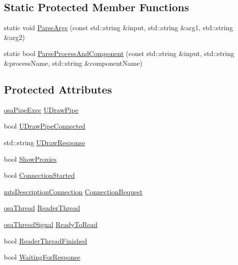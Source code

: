 \subsection*{Static Protected Member Functions}
\begin{DoxyCompactItemize}
\item 
static void \hyperlink{classmts_component_viewer_a514501a010d6f9cde03032d7853cde39}{Parse\-Args} (const std\-::string \&input, std\-::string \&arg1, std\-::string \&arg2)
\item 
static bool \hyperlink{classmts_component_viewer_aaaa3f74701e2fc95e7a26939dccee4b1}{Parse\-Process\-And\-Component} (const std\-::string \&input, std\-::string \&process\-Name, std\-::string \&component\-Name)
\end{DoxyCompactItemize}
\subsection*{Protected Attributes}
\begin{DoxyCompactItemize}
\item 
\hyperlink{classosa_pipe_exec}{osa\-Pipe\-Exec} \hyperlink{classmts_component_viewer_a4f2747dc20890be285fa6b031516c6dc}{U\-Draw\-Pipe}
\item 
bool \hyperlink{classmts_component_viewer_a7590f5f827427231d8fe2bd813feb22e}{U\-Draw\-Pipe\-Connected}
\item 
std\-::string \hyperlink{classmts_component_viewer_acae080559e0ab6cbb24070743348d9aa}{U\-Draw\-Response}
\item 
bool \hyperlink{classmts_component_viewer_a3e3249972f2cd16f18ea84aa0df92218}{Show\-Proxies}
\item 
bool \hyperlink{classmts_component_viewer_aa6617f20137e55bf8fe983d8587a22d2}{Connection\-Started}
\item 
\hyperlink{classmts_description_connection}{mts\-Description\-Connection} \hyperlink{classmts_component_viewer_ab4e2905d1679386f9a8d15d0bcaaf996}{Connection\-Request}
\item 
\hyperlink{classosa_thread}{osa\-Thread} \hyperlink{classmts_component_viewer_a5b608706d9dec221cd4ca599a165fec7}{Reader\-Thread}
\item 
\hyperlink{classosa_thread_signal}{osa\-Thread\-Signal} \hyperlink{classmts_component_viewer_a2b172a1000cad46b886f92073ca3a650}{Ready\-To\-Read}
\item 
bool \hyperlink{classmts_component_viewer_ab5cfa733f00890d5ee7ef44eac6624cf}{Reader\-Thread\-Finished}
\item 
bool \hyperlink{classmts_component_viewer_ad0d7132119ce154a8e7b646153ae0cc0}{Waiting\-For\-Response}
\end{DoxyCompactItemize}
